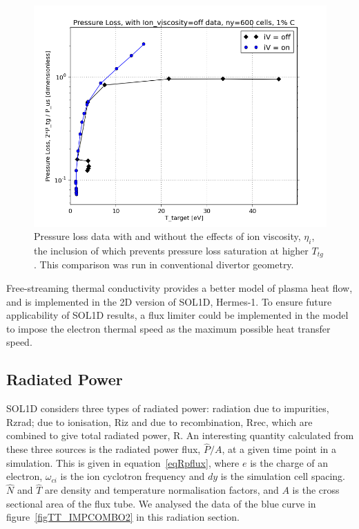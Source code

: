\documentclass[12pt]{article}  %
\providecommand{\Ttg}{$T_{tg}~$} %
\begin{document}
\begin{figure}
	\includegraphics[scale=0.5]{Figures/sol1d/PL_iVpts.png}
	\centering
	\caption{Pressure loss data with and without the effects of ion viscosity, $\eta_i$, the inclusion of which prevents pressure loss saturation at higher \Ttg. This comparison was run in conventional divertor geometry.}\label{figPL_iVpts}
\end{figure}

Free-streaming thermal conductivity provides a better model of plasma heat flow, and is implemented in the 2D version of SOL1D, Hermes-1. To ensure future applicability of SOL1D results, a flux limiter could be implemented in the model to impose the electron thermal speed as the maximum possible heat transfer speed.



\subsection{Radiated Power}\label{ssecRpower}
SOL1D considers three types of radiated power: radiation due to impurities, Rzrad; due to ionisation, Riz and due to recombination, Rrec, which are combined to give total radiated power, R. An interesting quantity calculated from these three sources is the radiated power flux, $ \hat{P}/A $, at a given time point in a simulation. This is given in equation~\ref{eqRpflux}, where $e$ is the charge of an electron, $\omega_{ci}$ is the ion cyclotron frequency and $dy$ is the simulation cell spacing. $\hat{N}$ and $\hat{T}$ are density and temperature normalisation factors, and $ A $ is the cross sectional area of the flux tube. We analysed the data of the blue curve in figure~\ref{figTT_IMPCOMBO2} in this radiation section. 
\end{document}
